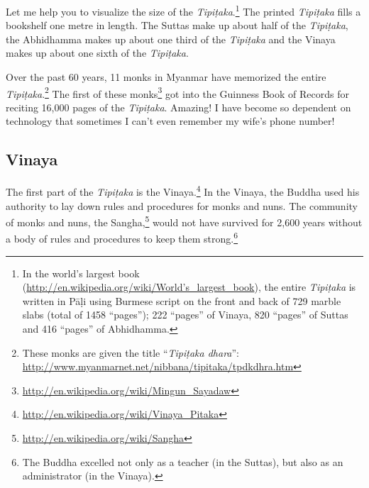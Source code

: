\pagebreak

Let me help you to visualize the size of the \textit{Tipiṭaka}.\footnote{In the world’s largest book (\url{http://en.wikipedia.org/wiki/World’s_largest_book}), the entire \textit{Tipiṭaka} is written in Pāḷi using Burmese script on the front and back of 729 marble slabs (total of 1458 “pages”); 222 “pages” of Vinaya, 820 “pages” of Suttas and 416 “pages” of Abhidhamma.} The printed \textit{Tipiṭaka} fills a bookshelf one metre in length. The Suttas make up about half of the \textit{Tipiṭaka}, the Abhidhamma makes up about one third of the \textit{Tipiṭaka} and the Vinaya makes up about one sixth of the \textit{Tipiṭaka}.

Over the past 60 years, 11 monks in Myanmar have memorized the entire \textit{Tipiṭaka}.\footnote{These monks are given the title “\textit{Tipiṭaka dhara}”: \url {http://www.myanmarnet.net/nibbana/tipitaka/tpdkdhra.htm}} The first of these monks\footnote{\url{http://en.wikipedia.org/wiki/Mingun_Sayadaw}} got into the Guinness Book of Records for reciting 16,000 pages of the \textit{Tipiṭaka}. Amazing! I have become so dependent on technology that sometimes I can’t even remember my wife’s phone number!

\subsection*{Vinaya}

The first part of the \textit{Tipiṭaka} is the Vinaya.\footnote{\url{http://en.wikipedia.org/wiki/Vinaya_Pitaka}} In the Vinaya, the Buddha used his authority to lay down rules and procedures for monks and nuns. The community of monks and nuns, the Sangha,\footnote{\url{http://en.wikipedia.org/wiki/Sangha}} would not have survived for 2,600 years without a body of rules and procedures to keep them strong.\footnote{The Buddha excelled not only as a teacher (in the Suttas), but also as an administrator (in the Vinaya).}


